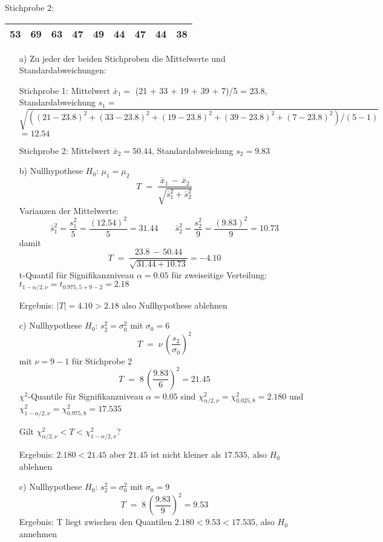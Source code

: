 Stichprobe 2:

\begin{tabular}{|c|c|c|c|c|c|c|c|c|}
\hline
53 & 69 & 63 & 47 & 49 & 44 & 47 & 44 & 38\\
\hline
\end{tabular}

\begin{itemize}
\item[a)] Zu jeder der beiden Stichproben die Mittelwerte und Standardabweichungen:

Stichprobe 1: Mittelwert $\bar x_1 = $ (21 + 33 + 19 + 39 + 7)/5 = 23.8,
Standardabweichung $s_1 = $ $\sqrt{((21-23.8)^2 + (33-23.8)^2 + (19-23.8)^2 + (39-23.8)^2 + (7-23.8)^2)/(5-1)}$ $= 12.54$

Stichprobe 2: Mittelwert $\bar x_2 = 50.44$, Standardabweichung $s_2 = 9.83$

\item[b)] Nullhypothese $H_0$: $\mu_1 = \mu_2$
$$
T \; = \; \frac{\bar x_1 \, - \, \bar x_2}{\sqrt{\bar s_1^2 + \bar s_2^2}}
$$
Varianzen der Mittelwerte:
$$
\bar s_1^2 = \frac{s_1^2}{5} = \frac{(12.54)^2}{5} = 31.44
\qquad
\bar s_2^2 = \frac{s_2^2}{9} = \frac{(9.83)^2}{9} = 10.73
$$
damit
$$
T \; = \; \frac{23.8 \, - \, 50.44}{\sqrt{31.44 + 10.73}} = -4.10
$$
t-Quantil für Signifikanzniveau $\alpha = 0.05$ für zweiseitige Verteilung:
$t_{1-\alpha/2,\nu} = t_{0.975,5+9-2} = 2.18$

Ergebnis: $|T| = 4.10 > 2.18$ also Nullhypothese ablehnen

\item[c)] Nullhypothese $H_0$: $s_2^2 = \sigma_0^2$ mit $\sigma_0 = 6$
$$
T \; = \; \nu \, \left( \frac{s_2}{\sigma_0} \right)^2
$$
mit $\nu = 9-1$ für Stichprobe 2
$$
T \; = \; 8 \, \left( \frac{9.83}{6} \right)^2 = 21.45
$$
$\chi^2$-Quantile für Signifikanzniveau $\alpha = 0.05$ sind
$\chi^2_{\alpha/2,\nu} = \chi^2_{0.025,8} = 2.180$ und
$\chi^2_{1-\alpha/2,\nu} = \chi^2_{0.975,8} = 17.535$

Gilt $\chi^2_{\alpha/2,\nu} < T < \chi^2_{1-\alpha/2,\nu}$?

Ergebnis: $2.180 < 21.45$ aber $21.45$ ist nicht kleiner als $17.535$, also $H_0$ ablehnen

\item[c)] Nullhypothese $H_0$: $s_2^2 = \sigma_0^2$ mit $\sigma_0 = 9$
$$
T \; = \; 8 \, \left( \frac{9.83}{9} \right)^2 = 9.53
$$
Ergebnis:
T liegt zwischen den Quantilen $2.180 < 9.53 < 17.535$, also $H_0$ annehmen
\end{itemize}
